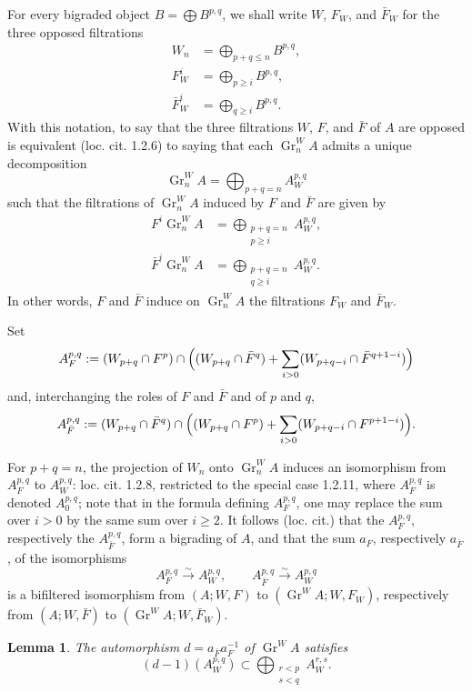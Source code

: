 \documentclass[12pt,a4paper]{article}
\theoremstyle{plain}
\newtheorem{lemma}{Lemma}[section]
\theoremstyle{definition}
\DeclareMathOperator{\Gr}{Gr}
\begin{document}
For every bigraded object $B=\bigoplus B^{p,q}$, we shall write $W$, $F_W$, and $\bar F_W$ for the three opposed filtrations
\begin{align*}
W_n&=\bigoplus_{p+q\le n}B^{p,q},\\
F_W^i&=\bigoplus_{p\ge i}B^{p,q},\\
\bar F_W^i&=\bigoplus_{q\ge i}B^{p,q}.
\end{align*}
With this notation, to say that the three filtrations $W$, $F$, and $\bar F$ of $A$ are opposed is equivalent (loc. cit. 1.2.6) to saying that each $\Gr_n^W A$ admits a unique decomposition
\[
\Gr_n^W A=\bigoplus_{p+q=n}A_W^{p,q}
\]
such that the filtrations of $\Gr_n^W A$ induced by $F$ and $\bar F$ are given by
\begin{align*}
F^i\Gr_n^W A&=\bigoplus_{\substack{p+q=n\\ p\ge i}}A_W^{p,q},\\
\bar F^i\Gr_n^W A&=\bigoplus_{\substack{p+q=n\\ q\ge i}}A_W^{p,q}.
\end{align*}
In other words, $F$ and $\bar F$ induce on $\Gr_n^W A$ the filtrations $F_W$ and $\bar F_W$.

Set
\[
A_F^{p,q}:=(W_{p+q}\cap F^p)\cap\Bigl((W_{p+q}\cap \bar F^q)+\sum_{i>0}(W_{p+q-i}\cap \bar F^{q+1-i})\Bigr)
\]
and, interchanging the roles of $F$ and $\bar F$ and of $p$ and $q$,
\[
A_{\bar F}^{p,q}:=(W_{p+q}\cap \bar F^q)\cap\Bigl((W_{p+q}\cap F^p)+\sum_{i>0}(W_{p+q-i}\cap F^{p+1-i})\Bigr).
\]

For $p+q=n$, the projection of $W_n$ onto $\Gr_n^W A$ induces an isomorphism from $A_F^{p,q}$ to $A_W^{p,q}$: loc. cit. 1.2.8, restricted to the special case 1.2.11, where $A_F^{p,q}$ is denoted $A_0^{p,q}$; note that in the formula defining $A_F^{p,q}$, one may replace the sum over $i>0$ by the same sum over $i\ge2$. It follows (loc. cit.) that the $A_F^{p,q}$, respectively the $A_{\bar F}^{p,q}$, form a bigrading of $A$, and that the sum $a_F$, respectively $a_{\bar F}$, of the isomorphisms
\[
A_F^{p,q}\xrightarrow{\sim}A_W^{p,q},\qquad A_{\bar F}^{p,q}\xrightarrow{\sim}A_W^{p,q}
\]
is a bifiltered isomorphism from $(A;W,F)$ to $(\Gr^W\!A;W,F_W)$, respectively from $(A;W,\bar F)$ to $(\Gr^W\!A;W,\bar F_W)$.

\begin{lemma}
The automorphism $d=a_{\bar F}a_F^{-1}$ of $\Gr^W\!A$ satisfies
\begin{equation}\label{eq:1.1.1}
(d-1)(A_W^{p,q})\subset \bigoplus_{\substack{r<p\\ s<q}}A_W^{r,s}.\tag{1.1.1}
\end{equation}
\end{lemma}
\end{document}
